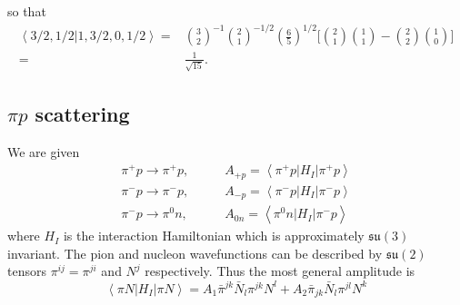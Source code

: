 \documentclass[main.tex]{subfiles}
\begin{document}
so that
\begin{align}
\left<3/2,1/2|1,3/2,0,1/2\right>=&\binom{3}{2}^{-1}\binom{2}{1}^{-1/2}\left(\frac{6}{5}\right)^{1/2}\Big[\binom{2}{1}\binom{1}{1}-\binom{2}{2}\binom{1}{0}\Big]\\
=&\frac{1}{\sqrt{15}}.
\end{align}

\subsection{$\pi p$ scattering }
We are given
\begin{align}
\pi^+p\rightarrow\pi^+p, &\qquad A_{+p}=\left<\pi^+p|H_I|\pi^+p\right>\\
\pi^-p\rightarrow\pi^-p ,&\qquad A_{-p}=\left<\pi^-p|H_I|\pi^-p\right>\\
\pi^-p\rightarrow\pi^0n ,&\qquad A_{0n}=\left<\pi^0n|H_I|\pi^-p\right>
\end{align}
where $H_I$ is the interaction Hamiltonian which is approximately $\mathfrak{su}(3)$ invariant. The pion and nucleon wavefunctions can be described by $\mathfrak{su}(2)$ tensors $\pi^{ij}=\pi^{ji}$ and $N^j$ respectively. Thus the most general amplitude is
\begin{equation}
\left<\pi N|H_I|\pi N\right>=A_1\bar{\pi}^{jk}\bar{N}_l\pi^{jk}N^l+A_2\bar{\pi}_{jk}\bar{N}_l\pi^{jl}N^k
\end{equation}
\end{document}
